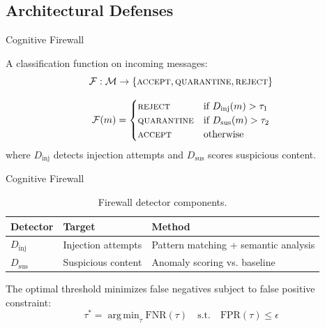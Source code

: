 \documentclass[
  ignorenonframetext,
]{beamer}
\DeclareMathOperator*{\argmin}{arg\,min}
\begin{document}
\subsection{Architectural Defenses}\label{sec:arch-defenses}

\begin{frame}[allowframebreaks]{Cognitive Firewall}
\protect{}\label{cognitive-firewall}
\begin{definition}
\label{def:firewall}
A classification function on incoming messages:
\begin{equation}
\label{eq:firewall}
\mathcal{F}: \mathcal{M} \to \{\textsc{accept}, \textsc{quarantine}, \textsc{reject}\}
\end{equation}
\end{definition}

\begin{definition}
\label{def:firewall-rules}
\begin{equation}
\label{eq:firewall-rules}
\mathcal{F}(m) = \begin{cases}
\textsc{reject} & \text{if } D_{\text{inj}}(m) > \tau_1 \\
\textsc{quarantine} & \text{if } D_{\text{sus}}(m) > \tau_2 \\
\textsc{accept} & \text{otherwise}
\end{cases}
\end{equation}
where $D_{\text{inj}}$ detects injection attempts and $D_{\text{sus}}$ scores suspicious content.
\end{definition}

\end{frame}

\begin{frame}[allowframebreaks]{Cognitive Firewall}
\begin{table}[htbp]
\centering
\caption{Firewall detector components.}
\label{tab:firewall-detectors}
\begin{tabular}{@{}llp{5cm}@{}}
\toprule
Detector & Target & Method \\
\midrule
$D_{\text{inj}}$ & Injection attempts & Pattern matching + semantic analysis \\
$D_{\text{sus}}$ & Suspicious content & Anomaly scoring vs. baseline \\
\bottomrule
\end{tabular}
\end{table}

\begin{theorem}
\label{thm:threshold-selection}
The optimal threshold minimizes false negatives subject to false positive constraint:
\begin{equation}
\label{eq:threshold-opt}
\tau^* = \argmin_\tau \text{FNR}(\tau) \quad \text{s.t.} \quad \text{FPR}(\tau) \leq \epsilon
\end{equation}
\end{theorem}
\end{frame}
\end{document}
